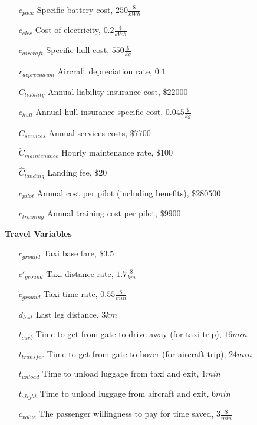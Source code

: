 \documentclass[12pt, letter]{article}
\begin{document}
\begin{itemize}
	\item[$c_{pack}$] Specific battery cost, $250 \frac{\$}{kWh}$
	\item[$c_{elec}$] Cost of electricity, $0.2 \frac{\$}{kWh}$
	\item[$c_{aircraft}$] Specific hull cost, $550 \frac{\$}{kg}$
	\item[$r_{depreciation}$] Aircraft depreciation rate, $0.1$
	\item[$C_{liability}$] Annual liability insurance cost, $\$22000$
	\item[$c_{hull}$] Annual hull insurance specific cost, $0.045 \frac{\$}{kg}$
	\item[$C_{services}$] Annual services costs, $\$7700$
	\item[$\dot{C}_{maintenance}$] Hourly maintenance rate, $\$100$
	\item[$\hat{C}_{landing}$] Landing fee, $\$20$
	\item[$c_{pilot}$] Annual cost per pilot (including benefits), $\$280500$
	\item[$c_{training}$] Annual training cost per pilot, $\$9900$
	\item[]
\end{itemize}
\textbf{Travel Variables}
\begin{itemize}
	\item[$c_{ground}$] Taxi base fare, $\$3.5$
	\item[$c'_{ground}$] Taxi distance rate, $1.7 \frac{\$}{km}$
	\item[$\dot{c}_{ground}$] Taxi time rate, $0.55 \frac{\$}{min}$
	\item[$d_{last}$] Last leg distance, $3 km$
	\item[$t_{curb}$] Time to get from gate to drive away (for taxi trip), $16 min$
	\item[$t_{transfer}$] Time to get from gate to hover (for aircraft trip), $24 min$
	\item[$t_{unload}$] Time to unload luggage from taxi and exit, $1 min$
	\item[$t_{alight}$] Time to unload luggage from aircraft and exit, $6 min$
	\item[$c_{value}$] The passenger willingness to pay for time saved, $3\frac{\$}{min}$
	\item[]
\end{itemize}
\end{document}
